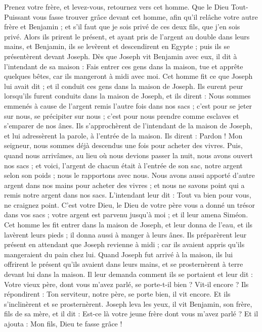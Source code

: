 \begin{multicols}{2}
Prenez votre frère, et levez-vous, retournez vers cet homme.
Que le Dieu Tout-Puissant vous fasse trouver grâce devant cet homme, afin qu'il relâche votre autre frère et Benjamin ; et s'il faut que je sois privé de ces deux fils, que j'en sois privé.
Alors ils prirent le présent, et ayant pris de l'argent au double dans leurs mains, et Benjamin, ils se levèrent et descendirent en Egypte ; puis ils se présentèrent devant Joseph.
Dès que Joseph vit Benjamin avec eux, il dit à l'intendant de sa maison : Fais entrer ces gens dans la maison, tue et apprête quelques bêtes, car ils mangeront à midi avec moi.
Cet homme fit ce que Joseph lui avait dit ; et il conduit ces gens dans la maison de Joseph.
Ils eurent peur lorsqu'ils furent conduits dans la maison de Joseph, et ils dirent : Nous sommes emmenés à cause de l'argent remis l'autre fois dans nos sacs ; c'est pour se jeter sur nous, se précipiter sur nous ; c'est pour nous prendre comme esclaves et s'emparer de nos ânes.
Ils s'approchèrent de l'intendant de la maison de Joseph, et lui adressèrent la parole, à l'entrée de la maison.
Ils dirent : Pardon ! Mon seigneur, nous sommes déjà descendus une fois pour acheter des vivres.
Puis, quand nous arrivâmes, au lieu où nous devions passer la nuit, nous avons ouvert nos sacs ; et voici, l'argent de chacun était à l'entrée de son sac, notre argent selon son poids ; nous le rapportons avec nous.
Nous avons aussi apporté d'autre argent dans nos mains pour acheter des vivres ; et nous ne savons point qui a remis notre argent dans nos sacs.
L'intendant leur dit : Tout va bien pour vous, ne craignez point. C'est votre Dieu, le Dieu de votre père vous a donné un trésor dans vos sacs ; votre argent est parvenu jusqu'à moi ; et il leur amena Siméon.
Cet homme les fit entrer dans la maison de Joseph, et leur donna de l'eau, et ils lavèrent leurs pieds ; il donna aussi à manger à leurs ânes.
Ils préparèrent leur présent en attendant que Joseph revienne à midi ; car ils avaient appris qu'ils mangeraient du pain chez lui.
Quand Joseph fut arrivé à la maison, ils lui offrirent le présent qu'ils avaient dans leurs mains, et se prosternèrent à terre devant lui dans la maison.
Il leur demanda comment ils se portaient et leur dit : Votre vieux père, dont vous m'avez parlé, se porte-t-il bien ? Vit-il encore ?
Ils répondirent : Ton serviteur, notre père, se porte bien, il vit encore. Et ils s'inclinèrent et se prosternèrent.
Joseph leva les yeux, il vit Benjamin, son frère, fils de sa mère, et il dit : Est-ce là votre jeune frère dont vous m'avez parlé ? Et il ajouta : Mon fils, Dieu te fasse grâce !

\end{multicols}
